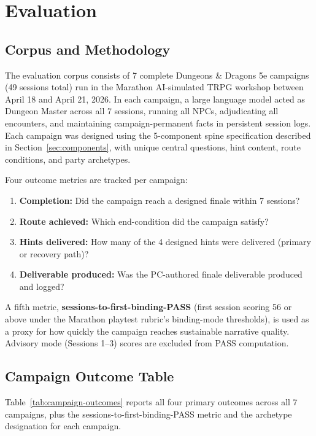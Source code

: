 
\section{Evaluation}
\label{sec:evaluation}

\subsection{Corpus and Methodology}

The evaluation corpus consists of 7 complete Dungeons \& Dragons 5e campaigns
(49 sessions total) run in the Marathon AI-simulated TRPG workshop between
April 18 and April 21, 2026. In each campaign, a large language model acted as
Dungeon Master across all 7 sessions, running all NPCs, adjudicating all
encounters, and maintaining campaign-permanent facts in persistent session logs.
Each campaign was designed using the 5-component spine specification described
in Section~\ref{sec:components}, with unique central questions, hint content,
route conditions, and party archetypes.

Four outcome metrics are tracked per campaign:

\begin{enumerate}
  \item \textbf{Completion:} Did the campaign reach a designed finale within 7
    sessions?
  \item \textbf{Route achieved:} Which end-condition did the campaign satisfy?
  \item \textbf{Hints delivered:} How many of the 4 designed hints were delivered
    (primary or recovery path)?
  \item \textbf{Deliverable produced:} Was the PC-authored finale deliverable
    produced and logged?
\end{enumerate}

A fifth metric, \textbf{sessions-to-first-binding-PASS} (first session scoring
56 or above under the Marathon playtest rubric's binding-mode thresholds), is
used as a proxy for how quickly the campaign reaches sustainable narrative quality.
Advisory mode (Sessions 1--3) scores are excluded from PASS computation.

\subsection{Campaign Outcome Table}

Table~\ref{tab:campaign-outcomes} reports all four primary outcomes across all 7
campaigns, plus the sessions-to-first-binding-PASS metric and the archetype
designation for each campaign.

